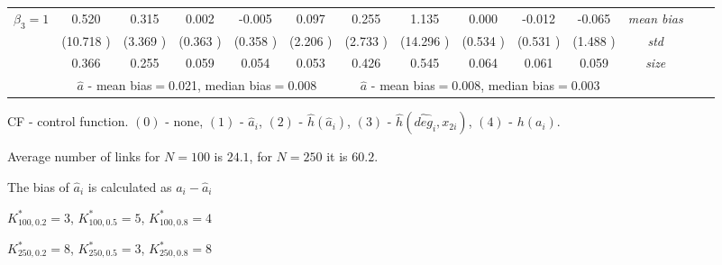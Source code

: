 \begin{table}
\begin{threeparttable}
{\begin{tabular}{|c|c|c|c|c|c|c|c|c|c|c|c|c|c|}
\multirow{4}{*}{$\beta_3=1$}& 0.520 & 0.315 &0.002& -0.005 &0.097 &0.255 &1.135 &0.000 &-0.012& -0.065 &\textit{mean bias} \\ 
&(10.718 )&(3.369 )&(0.363 )&(0.358 )&(2.206 )&(2.733 )&(14.296 )&(0.534 )&(0.531 )&(1.488 )&\textit{std}\\ 
& 0.366 & 0.255 &0.059 &0.054 &0.053 &0.426& 0.545& 0.064 &0.061 &0.059 &\textit{size} \\\midrule 
&\multicolumn{5}{|c|}{$\hat{a}$ - mean bias$=$0.021, median bias$=$0.008 }&\multicolumn{5}{|c|}{$\hat{a}$ - mean bias$=$0.008, median bias$=$0.003 }&\\ \hline 
\end{tabular}} 
\begin{tablenotes}\tiny 
\item CF - control function. $(0)$ - none, $(1)$ - $\hat{a}_i$,  $(2)$ - $\hat{h}(\hat{a}_i)$, $(3)$ - $\hat{h}(\widehat{deg}_i,x_{2i})$, $(4)$ - $h(a_i)$. 
\item Average number of links for $N=100$ is $24.1$, for $N=250$ it is $60.2$. 
\item The bias of $\hat{a}_i$ is calculated as $a_i-\hat{a}_i$ 
\item $K^*_{100,0.2}=3$, $K^*_{100,0.5}=5$, $K^*_{100,0.8}=4$ 
\item $K^*_{250,0.2}=8$, $K^*_{250,0.5}=3$, $K^*_{250,0.8}=8$ 
  \end{tablenotes} 
\end{threeparttable} 
\end{table} 
